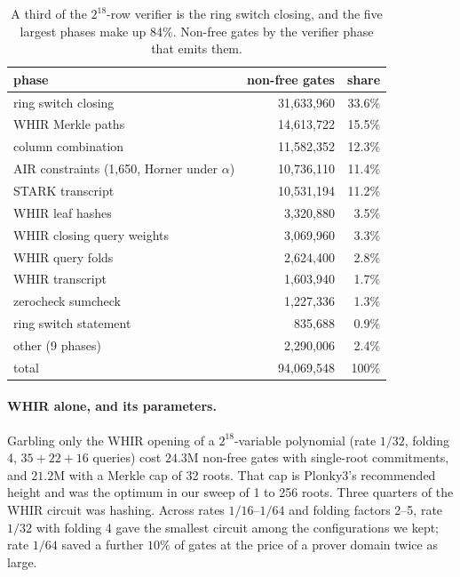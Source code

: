 \documentclass[11pt]{article}
\begin{document}
\begin{table}[t]\centering\small
\begin{tabular}{lrr}\toprule
phase & non-free gates & share\\\midrule
ring switch closing & 31{,}633{,}960 & 33.6\%\\
WHIR Merkle paths & 14{,}613{,}722 & 15.5\%\\
column combination & 11{,}582{,}352 & 12.3\%\\
AIR constraints (1{,}650, Horner under $\alpha$) & 10{,}736{,}110 & 11.4\%\\
STARK transcript & 10{,}531{,}194 & 11.2\%\\
WHIR leaf hashes & 3{,}320{,}880 & 3.5\%\\
WHIR closing query weights & 3{,}069{,}960 & 3.3\%\\
WHIR query folds & 2{,}624{,}400 & 2.8\%\\
WHIR transcript & 1{,}603{,}940 & 1.7\%\\
zerocheck sumcheck & 1{,}227{,}336 & 1.3\%\\
ring switch statement & 835{,}688 & 0.9\%\\
other (9 phases) & 2{,}290{,}006 & 2.4\%\\\midrule
total & 94{,}069{,}548 & 100\%\\\bottomrule
\end{tabular}
\caption{A third of the $2^{18}$-row verifier is the ring switch closing, and the
five largest phases make up 84\%. Non-free gates by the verifier phase that emits
them.}
\label{tab:profile}
\end{table}

\paragraph{WHIR alone, and its parameters.} Garbling only the WHIR opening of a
$2^{18}$-variable polynomial (rate $1/32$, folding 4, $35+22+16$ queries) cost
$24.3$M non-free gates with single-root commitments, and $21.2$M with a Merkle
cap of 32 roots. That cap is Plonky3's recommended height and was the optimum in
our sweep of 1 to 256 roots. Three quarters of the WHIR circuit was hashing.
Across rates $1/16$--$1/64$ and folding factors 2--5, rate $1/32$ with folding 4
gave the smallest circuit among the configurations we kept; rate $1/64$ saved a
further $10\%$ of gates at the price of a prover domain twice as large.
\end{document}
